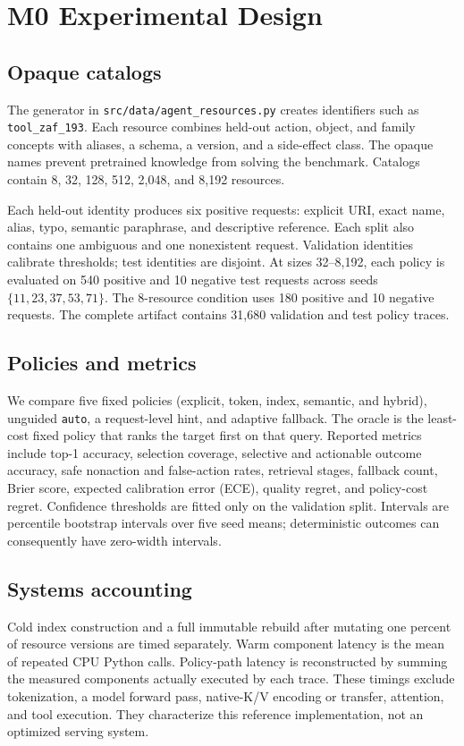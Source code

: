 \appendix
\section{M0 Experimental Design}
\subsection{Opaque catalogs}
The generator in \texttt{src/data/agent\_resources.py} creates identifiers such
as \texttt{tool\_zaf\_193}. Each resource combines held-out action, object, and
family concepts with aliases, a schema, a version, and a side-effect class.
The opaque names prevent pretrained knowledge from solving the benchmark.
Catalogs contain 8, 32, 128, 512, 2,048, and 8,192 resources.

Each held-out identity produces six positive requests: explicit URI, exact
name, alias, typo, semantic paraphrase, and descriptive reference. Each split
also contains one ambiguous and one nonexistent request. Validation identities
calibrate thresholds; test identities are disjoint. At sizes 32--8,192, each
policy is evaluated on 540 positive and 10 negative test requests across seeds
$\{11,23,37,53,71\}$. The 8-resource condition uses 180 positive and 10
negative requests. The complete artifact contains 31,680 validation and test
policy traces.

\subsection{Policies and metrics}
We compare five fixed policies (explicit, token, index, semantic, and hybrid),
unguided \texttt{auto}, a request-level hint, and adaptive fallback. The oracle
is the least-cost fixed policy that ranks the target first on that query.
Reported metrics include top-1 accuracy, selection coverage, selective and
actionable outcome accuracy, safe nonaction and false-action rates, retrieval
stages, fallback count, Brier score, expected calibration error (ECE), quality
regret, and policy-cost regret. Confidence thresholds are fitted only on the
validation split. Intervals are percentile bootstrap intervals over five seed
means; deterministic outcomes can consequently have zero-width intervals.

\subsection{Systems accounting}
Cold index construction and a full immutable rebuild after mutating one percent
of resource versions are timed separately. Warm component latency is the mean
of repeated CPU Python calls. Policy-path latency is reconstructed by summing
the measured components actually executed by each trace. These timings exclude
tokenization, a model forward pass, native-K/V encoding or transfer, attention,
and tool execution. They characterize this reference implementation, not an
optimized serving system.

